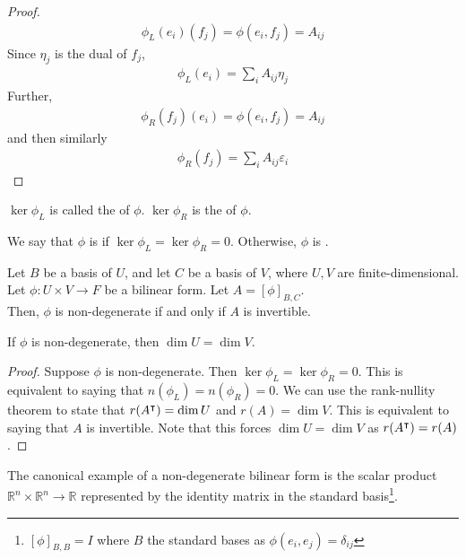 \begin{proof}
	\begin{align*}
		\phi_L(e_i)(f_j) = \phi(e_i, f_j) = A_{ij}
	\end{align*}
	Since $\eta_j$ is the dual of $f_j$,
	\begin{align*}
		\phi_L(e_i) = \sum_i A_{ij} \eta_j
	\end{align*}
	Further,
	\begin{align*}
		\phi_R(f_j)(e_i) = \phi(e_i, f_j) = A_{ij}
	\end{align*}
	and then similarly
	\begin{align*}
		\phi_R(f_j) = \sum_i A_{ij} \varepsilon_i
	\end{align*}
\end{proof}

\begin{definition}
	$\ker \phi_L$ is called the  of $\phi$.
	$\ker \phi_R$ is the  of $\phi$.
\end{definition}

\begin{definition}
	We say that $\phi$ is  if $\ker \phi_L = \ker \phi_R = \qty{0}$.
	Otherwise, $\phi$ is .
\end{definition}

\begin{lemma}
	Let $B$ be a basis of $U$, and let $C$ be a basis of $V$, where $U, V$ are finite-dimensional.
	Let $\phi \colon U \times V \to F$ be a bilinear form.
	Let $A = [\phi]_{B,C}$. \\
	Then, $\phi$ is non-degenerate if and only if $A$ is invertible.
\end{lemma}

\begin{corollary}
	If $\phi$ is non-degenerate, then $\dim U = \dim V$.
\end{corollary}
\begin{proof}
	Suppose $\phi$ is non-degenerate.
	Then $\ker \phi_L = \ker \phi_R = \qty{0}$.
	This is equivalent to saying that $n(\phi_L) = n(\phi_R) = 0$.
	We can use the rank-nullity theorem to state that $r(A^\intercal) = \dim U$ and $r(A) = \dim V$.
	This is equivalent to saying that $A$ is invertible.
	Note that this forces $\dim U = \dim V$ as $r(A^\intercal) = r(A)$.
\end{proof}
\begin{remark}
	The canonical example of a non-degenerate bilinear form is the scalar product $\mathbb R^n \times \mathbb R^n \to \mathbb R$ represented by the identity matrix in the standard basis\footnote{$[\phi]_{B, B} = I$ where $B$ the standard bases as $\phi(e_i, e_j) = \delta_{ij}$}.
\end{remark}

